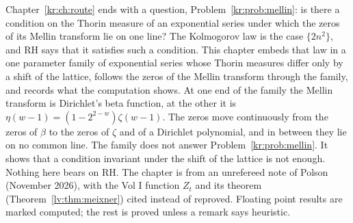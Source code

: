 \label{ml:ch:mellin}

Chapter~\ref{kr:ch:route} ends with a question, Problem~\ref{kr:prob:mellin}: is there a condition on the Thorin measure of an exponential series under which the zeros of its Mellin transform lie on one line? The Kolmogorov law is the case $\{2n^2\}$, and RH says that it satisfies such a condition. This chapter embeds that law in a one parameter family of exponential series whose Thorin measures differ only by a shift of the lattice, follows the zeros of the Mellin transform through the family, and records what the computation shows. At one end of the family the Mellin transform is Dirichlet's beta function, at the other it is $\eta(w-1)=(1-2^{2-w})\zeta(w-1)$. The zeros move continuously from the zeros of $\beta$ to the zeros of $\zeta$ and of a Dirichlet polynomial, and in between they lie on no common line. The family does not answer Problem~\ref{kr:prob:mellin}. It shows that a condition invariant under the shift of the lattice is not enough. Nothing here bears on RH. The chapter is from an unrefereed note of Polson (November 2026), with the Vol I function $Z_t$ and its theorem (Theorem~\ref{lv:thm:meixner}) cited instead of reproved. Floating point results are marked computed; the rest is proved unless a remark says heuristic.

